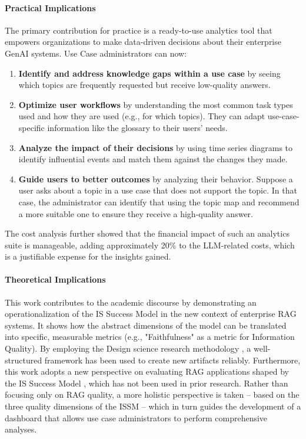 \documentclass[
	english,
	ruledheaders=section,%
	class=report,%
	thesis={type=bachelor},%
	accentcolor=1b,%
	custommargins=true,%
	marginpar=false,%
	parskip=half-,%
	fontsize=11pt,%
	DIV=14,
]{tudapub}
\begin{document}
\paragraph{Practical Implications} The primary contribution for practice is a ready-to-use analytics tool that empowers organizations to make data-driven decisions about their enterprise GenAI systems. Use Case administrators can now:
\begin{enumerate}
    \item \textbf{Identify and address knowledge gaps within a use case} by seeing which topics are frequently requested but receive low-quality answers.
    \item \textbf{Optimize user workflows} by understanding the most common task types used and how they are used (e.g., for which topics). They can adapt use-case-specific information like the glossary to their users' needs.
    \item \textbf{Analyze the impact of their decisions} by using time series diagrams to identify influential events and match them against the changes they made.
    \item \textbf{Guide users to better outcomes} by analyzing their behavior. Suppose a user asks about a topic in a use case that does not support the topic. In that case, the administrator can identify that using the topic map and recommend a more suitable one to ensure they receive a high-quality answer.
\end{enumerate}
The cost analysis further showed that the financial impact of such an analytics suite is manageable, adding approximately 20\% to the LLM-related costs, which is a justifiable expense for the insights gained.

\paragraph{Theoretical Implications} This work contributes to the academic discourse by demonstrating an operationalization of the IS Success Model \parencite{DeloneMcLean2003ISSuccessTenYearUpdate} in the new context of enterprise RAG systems. It shows how the abstract dimensions of the model can be translated into specific, measurable metrics (e.g., "Faithfulness" as a metric for Information Quality). By employing the Design science research methodology \parencite{Peffers2007}, a well-structured framework has been used to create new artifacts reliably. Furthermore, this work adopts a new perspective on evaluating RAG applications shaped by the IS Success Model \parencite{DeloneMcLean2003ISSuccessTenYearUpdate}, which has not been used in prior research. Rather than focusing only on RAG quality, a more holistic perspective is taken -- based on the three quality dimensions of the ISSM \parencite{DeloneMcLean2003ISSuccessTenYearUpdate} -- which in turn guides the development of a dashboard that allows use case administrators to perform comprehensive analyses.
\end{document}
